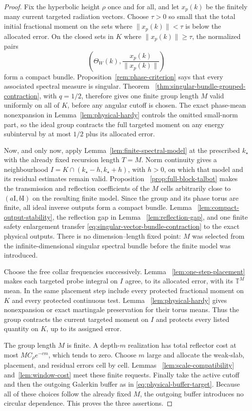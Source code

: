 \documentclass[11pt]{article}
\theoremstyle{remark}
\newcommand{\T}{\mathbb T}
\newcommand{\Id}{\mathrm I}
\begin{document}
\begin{proof}
Fix the hyperbolic height $\rho$ once and for all, and let $x_p(k)$ be the
finitely many current targeted radiation vectors.
Choose $\tau>0$ so small that the total initial fractional moment on the sets
where $\|x_p(k)\|<\tau$ is below the allocated error.  On the closed sets in
$K$ where $\|x_p(k)\|\geq\tau$, the normalized pairs
\[
 \left(\Theta_W(k),\frac{x_p(k)}{\|x_p(k)\|}\right)
\]
form a compact bundle.  Proposition~\ref{rem:phase-criterion} says that every
associated spectral measure is singular.  Theorem
~\ref{thm:singular-bundle-grouped-contraction}, with $q=1/2$, therefore gives
one finite group length $M$ valid uniformly on all of $K$, before any angular
cutoff is chosen.  The exact
phase-mean nonexpansion in Lemma~\ref{lem:physical-hardy} controls the omitted
small-norm part, so the ideal group contracts the full targeted moment on
any energy subinterval by at most $1/2$ plus its allocated error.

Now, and only now, apply Lemma~\ref{lem:finite-spectral-model} at the prescribed
$k_\star$ with the already fixed recursion length $T=M$.  Norm continuity
gives a neighbourhood $I=K\cap(k_\star-h,k_\star+h)$, with $h>0$, on which
that model and its residual estimates remain valid.  Proposition
~\ref{prop:full-block-talbot} makes the transmission and reflection
coefficients of the $M$ cells arbitrarily close to
$(a\Id,b\Id)$ on the resulting finite model.  Since the group and its phase
torus are finite, all ideal inverse outputs form a compact bundle.  Lemma
~\ref{lem:compact-output-stability}, the reflection gap in Lemma
~\ref{lem:reflection-gap}, and one finite safety enlargement transfer
\eqref{eq:singular-vector-bundle-contraction} to the exact physical outputs.
There is no dimension--length fixed point: $M$ was selected from the
infinite-dimensional singular spectral bundle before the finite model was
introduced.

Choose the free collar frequencies successively.  Lemma
~\ref{lem:one-step-placement} makes each targeted probe integral on $I$
agree, to its allocated error, with its $\T^M$ mean.  In the same
placement step include every protected fractional moment on $K$ and every
protected continuous test.  Lemma
~\ref{lem:physical-hardy} gives
nonexpansion or exact martingale preservation for their torus means.  Thus the
group contracts the current targeted moment on $I$ and protects every listed
quantity on $K$, up to its assigned error.

The group length $M$ is finite.  A depth-$m$ realization has total reflector
cost at most $MC_\rho e^{-cm}$, which tends to zero.  Choose $m$ large and
allocate the weak-slab, placement, and residual errors cell by cell.  Lemmas
~\ref{lem:scale-compatibility} and~\ref{lem:window-cost} meet these finite
requests.  Finally take the
active cutoff and then the outgoing Galerkin buffer as in
\eqref{eq:physical-buffer-target}.  Because all of these choices follow the
already fixed $M$, the outgoing buffer introduces no circular dependence.
This proves the three assertions.
\end{proof}
\end{document}
